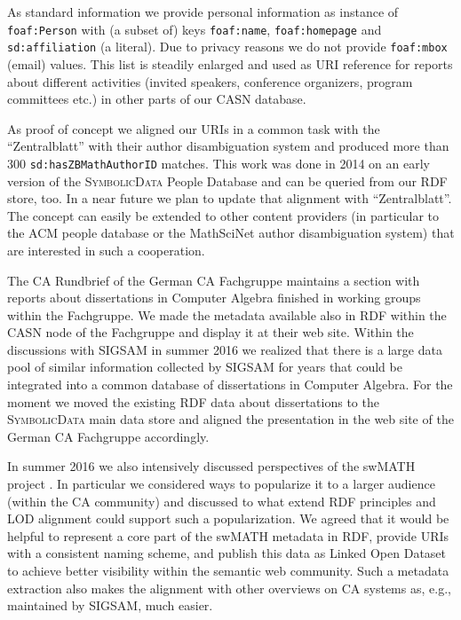 \documentclass[a4paper,11pt]{article}
\def\SD{\textsc{Symbolic\-Data}}
\begin{document}
\begin{multicols}{2}
As standard information we provide personal information as instance of
\texttt{foaf:Person} with (a subset of) keys \texttt{foaf:name},
\texttt{foaf:homepage} and \texttt{sd:affiliation} (a literal). Due to privacy
reasons we do not provide \texttt{foaf:mbox} (email) values.  This list is
steadily enlarged and used as URI reference for reports about different
activities (invited speakers, conference organizers, program committees etc.)
in other parts of our CASN database.

As proof of concept we aligned our URIs in a common task with the
``Zentralblatt'' with their author disambiguation system and produced more
than 300 \texttt{sd:hasZBMathAuthorID} matches. This work was done in 2014 on
an early version of the {\SD} People Database and can be queried from our RDF
store, too.  In a near future we plan to update that alignment with
``Zentralblatt''.  The concept can easily be extended to other content
providers (in particular to the ACM people database or the MathSciNet author
disambiguation system) that are interested in such a cooperation.


The CA Rundbrief of the German CA Fachgruppe maintains a section with reports
about dissertations in Computer Algebra finished in working groups within the
Fachgruppe.  We made the metadata available also in RDF within the CASN node
of the Fachgruppe and display it at their web site.  Within the discussions
with SIGSAM in summer 2016 we realized that there is a large data pool of
similar information collected by SIGSAM for years that could be integrated
into a common database of dissertations in Computer Algebra. For the moment we
moved the existing RDF data about dissertations to the {\SD} main data store
and aligned the presentation in the web site of the German CA Fachgruppe
accordingly.


In summer 2016 we also intensively discussed perspectives of the swMATH
project \cite{swmath}. In particular we considered ways to popularize it to a
larger audience (within the CA community) and discussed to what extend RDF
principles and LOD alignment could support such a popularization.  We agreed
that it would be helpful to represent a core part of the swMATH metadata in
RDF, provide URIs with a consistent naming scheme, and publish this data as
Linked Open Dataset to achieve better visibility within the semantic web
community.  Such a metadata extraction also makes the alignment with other
overviews on CA systems as, e.g., maintained by SIGSAM, much easier.


\end{multicols}
\end{document}
